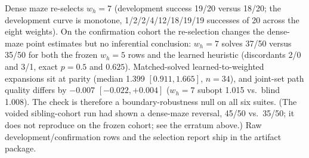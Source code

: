 \documentclass[letterpaper]{article} %
\begin{document}
Dense maze re-selects $w_h{=}7$ (development success 19/20 versus 18/20; the development curve is monotone, 1/2/2/4/12/18/19/19 successes of 20 across the eight weights). On the confirmation cohort the re-selection changes the dense-maze point estimates but no inferential conclusion: $w_h{=}7$ solves 37/50 versus 35/50 for both the frozen $w_h{=}5$ rows and the learned heuristic (discordants 2/0 and 3/1, exact $p{=}0.5$ and $0.625$). Matched-solved learned-to-weighted expansions sit at parity (median 1.399 $[0.911, 1.665]$, $n{=}34$), and joint-set path quality differs by $-0.007$ $[-0.022, +0.004]$ ($w_h{=}7$ subopt 1.015 vs.\ blind 1.008). The check is therefore a boundary-robustness null on all six suites. (The voided sibling-cohort run had shown a dense-maze reversal, 45/50 vs.\ 35/50; it does not reproduce on the frozen cohort; see the erratum above.) Raw development/confirmation rows and the selection report ship in the artifact package.
\end{document}
